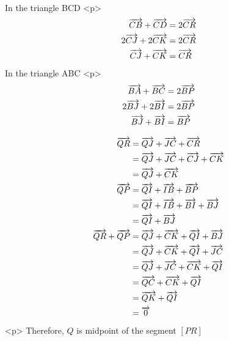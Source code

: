 In the triangle BCD
<p>
$$\begin{aligned}
\gdef\vec#1{\overrightarrow{#1}}

\vec{CB}+\vec{CD} &= 2\vec{CR}\\
2\vec{CJ}+2\vec{CK} &= 2\vec{CR}\\
\vec{CJ}+\vec{CK} &= \vec{CR}\\
\end{aligned}$$
In the triangle ABC
<p>
$$\begin{aligned}
\gdef\vec#1{\overrightarrow{#1}}

\vec{BA}+\vec{BC} &= 2\vec{BP}\\
2\vec{BJ}+2\vec{BI} &= 2\vec{BP}\\
\vec{BJ}+\vec{BI} &= \vec{BP}\\
\end{aligned}$$

$$\begin{aligned}
\gdef\vec#1{\overrightarrow{#1}}

\vec{QR} &= \vec{QJ} + \vec{JC} + \vec{CR}\\
&= \vec{QJ} + \vec{JC} + \vec{CJ} + \vec{CK}\\
&= \vec{QJ} + \vec{CK}\\

\vec{QP} &= \vec{QI} + \vec{IB} + \vec{BP}\\
&= \vec{QI} + \vec{IB} + \vec{BI} + \vec{BJ}\\
&= \vec{QI} + \vec{BJ}\\

\vec{QR}+\vec{QP} &=  \vec{QJ} + \vec{CK} + \vec{QI} + \vec{BJ}\\
&= \vec{QJ} + \vec{CK} + \vec{QI} + \vec{JC}\\
&= \vec{QJ} + \vec{JC} + \vec{CK} + \vec{QI}\\
&= \vec{QC} + \vec{CK} + \vec{QI}\\
&= \vec{QK} + \vec{QI}\\
&= \vec{0}
\end{aligned}$$
<p>
Therefore, $Q$ is midpoint of the segment $[PR]$

